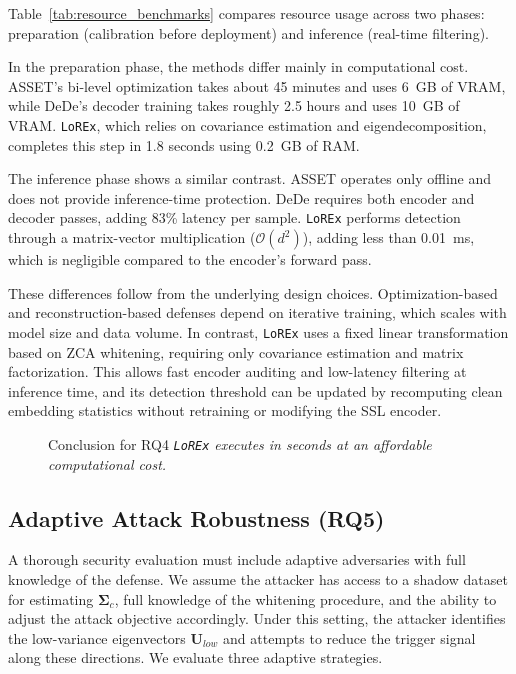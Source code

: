 \documentclass[letterpaper,twocolumn,10pt]{article}
\begin{document}
Table~\ref{tab:resource_benchmarks} compares resource usage across two phases: preparation (calibration before deployment) and inference (real-time filtering).

In the preparation phase, the methods differ mainly in computational cost. 
ASSET's bi-level optimization takes about 45 minutes and uses 6~GB of VRAM, while DeDe's decoder training takes roughly 2.5 hours and uses 10~GB of VRAM. 
\texttt{LoREx}, which relies on covariance estimation and eigendecomposition, completes this step in 1.8 seconds using 0.2~GB of RAM.

The inference phase shows a similar contrast. 
ASSET operates only offline and does not provide inference-time protection. 
DeDe requires both encoder and decoder passes, adding 83\% latency per sample. 
\texttt{LoREx} performs detection through a matrix-vector multiplication ($\mathcal{O}(d^2)$), adding less than 0.01~ms, which is negligible compared to the encoder's forward pass.

These differences follow from the underlying design choices. Optimization-based and reconstruction-based defenses depend on iterative training, which scales with model size and data volume. 
In contrast, \texttt{LoREx} uses a fixed linear transformation based on ZCA whitening, requiring only covariance estimation and matrix factorization. 
This allows fast encoder auditing and low-latency filtering at inference time, and its detection threshold can be updated by recomputing clean embedding statistics without retraining or modifying the SSL encoder.


\begin{figure}[H]
\centering
\begin{rqconclusion}{Conclusion for RQ4}
\textit{\texttt{LoREx} executes in seconds at an affordable computational cost.}
\end{rqconclusion}
\vspace{-0.25cm}
\end{figure}

\subsection{Adaptive Attack Robustness (RQ5)}
\label{exp_adaptive}
A thorough security evaluation must include adaptive adversaries with full knowledge of the defense. 
We assume the attacker has access to a shadow dataset for estimating $\bm{\Sigma}_c$, full knowledge of the whitening procedure, and the ability to adjust the attack objective accordingly. 
Under this setting, the attacker identifies the low-variance eigenvectors $\mathbf{U}_{low}$ and attempts to reduce the trigger signal along these directions. 
We evaluate three adaptive strategies.
\end{document}

